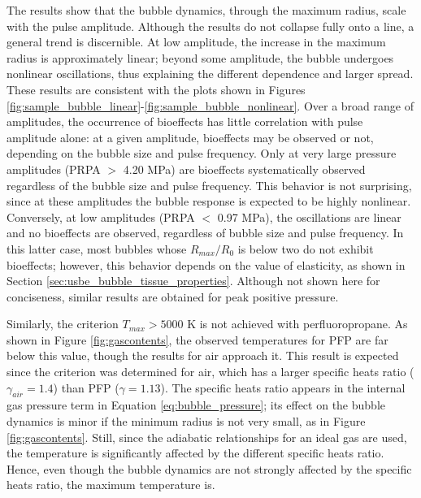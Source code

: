 The results show that the bubble dynamics, through the maximum radius,
scale with the pulse amplitude. Although the results do not collapse
fully onto a line, a general trend is discernible. At low amplitude,
the increase in the maximum radius is approximately linear; beyond
some amplitude, the bubble undergoes nonlinear oscillations, thus
explaining the different dependence and larger spread.  These results
are consistent with the plots shown in
Figures \ref{fig:sample_bubble_linear}-\ref{fig:sample_bubble_nonlinear}.
Over a broad range of amplitudes, the occurrence of bioeffects has
little correlation with pulse amplitude alone: at a given amplitude,
bioeffects may be observed or not, depending on the bubble size and
pulse frequency. Only at very large pressure amplitudes (PRPA $>$
4.20 MPa) are bioeffects systematically observed regardless of the
bubble size and pulse frequency. This behavior is not surprising,
since at these amplitudes the bubble response is expected to be highly
nonlinear. Conversely, at low amplitudes (PRPA $<$ 0.97 MPa), the
oscillations are linear and no bioeffects are observed, regardless of
bubble size and pulse frequency. In this latter case, most bubbles
whose $R_{max}/R_0$ is below two do not exhibit bioeffects; however,
this behavior depends on the value of elasticity, as shown in Section
\ref{sec:usbe_bubble_tissue_properties}. Although not shown here for
conciseness, similar results are obtained for peak positive pressure.


Similarly, the criterion $T_{max} > 5000$ K is not achieved with perfluoropropane.
As shown in Figure \ref{fig:gascontents}, the observed temperatures for
PFP are far below this value, though the results for air approach it. This
result is expected since the criterion was determined for air, which
has a larger specific heats ratio ($\gamma_{air}=1.4$) than
PFP ($\gamma= 1.13$). The specific heats ratio appears in
the internal gas pressure term in Equation \ref{eq:bubble_pressure}; its
effect on the bubble dynamics is minor if the minimum radius is not
very small, as in Figure \ref{fig:gascontents}. Still, since the
adiabatic relationships for an ideal gas are used, the temperature is
significantly affected by the different specific heats ratio. Hence,
even though the bubble dynamics are not strongly affected by the
specific heats ratio, the maximum temperature is.

